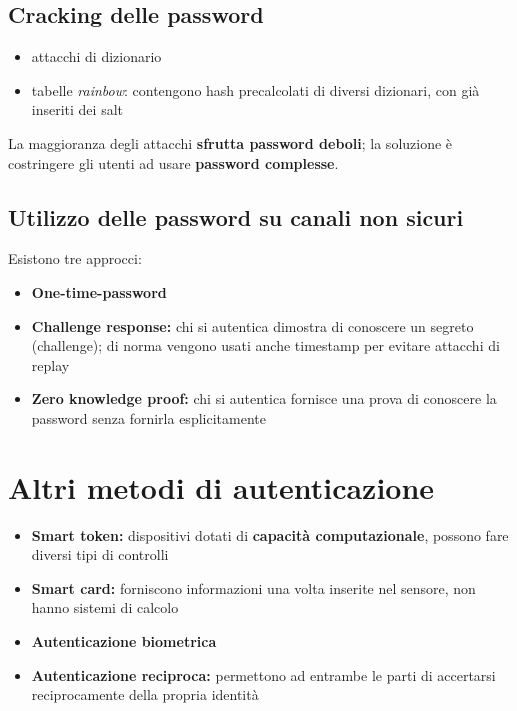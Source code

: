 \subsection{Cracking delle password}
\begin{itemize}
    \item attacchi di dizionario 
    \item tabelle \textit{rainbow}: contengono hash precalcolati di diversi dizionari, con già inseriti 
    dei salt 
\end{itemize}

\noindent La maggioranza degli attacchi \textbf{sfrutta password deboli}; la soluzione è costringere 
gli utenti ad usare \textbf{password complesse}.

\subsection{Utilizzo delle password su canali non sicuri}
Esistono tre approcci:
\begin{itemize}
    \item \textbf{One-time-password}
    \item \textbf{Challenge response:} chi si autentica dimostra di conoscere un segreto (challenge); 
    di norma vengono usati anche timestamp per evitare attacchi di replay
    \item \textbf{Zero knowledge proof:} chi si autentica fornisce una prova di conoscere la password 
    senza fornirla esplicitamente 
\end{itemize}

\section{Altri metodi di autenticazione}
\begin{itemize}
    \item \textbf{Smart token:} dispositivi dotati di \textbf{capacità computazionale}, possono fare diversi tipi di controlli 
    \item \textbf{Smart card:} forniscono informazioni una volta inserite nel sensore, non hanno sistemi di calcolo 
    \item \textbf{Autenticazione biometrica}
    \item \textbf{Autenticazione reciproca:} permettono ad entrambe le parti di accertarsi reciprocamente della propria identità
\end{itemize}



